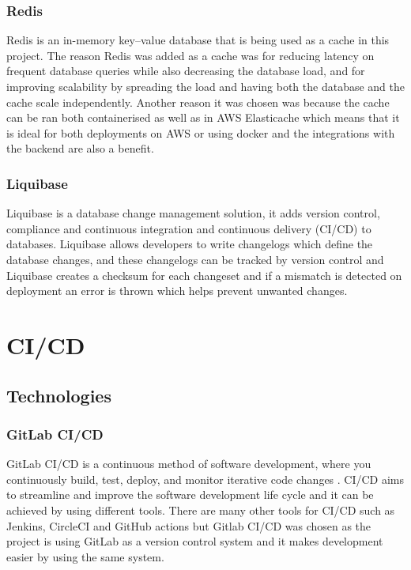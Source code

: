 \documentclass[]{project_report}
\begin{document}
\subsubsection{Redis}

Redis is an in-memory key–value database that is being used as a cache in this project. The reason Redis was added as a cache was for reducing latency on frequent database queries while also decreasing the database load, and for improving scalability by spreading the load and having both the database and the cache scale independently. Another reason it was chosen was because the cache can be ran both containerised as well as in AWS Elasticache which means that it is ideal for both deployments on AWS or using docker and the integrations with the backend are also a benefit.

\subsubsection{Liquibase}

Liquibase is a database change management solution, it adds version control, compliance and continuous integration and continuous delivery (CI/CD) to databases. Liquibase allows developers to write changelogs which define the database changes, and these changelogs can be tracked by version control and Liquibase creates a checksum for each changeset and if a mismatch is detected on deployment an error is thrown which helps prevent unwanted changes.


\section{CI/CD}
\subsection{Technologies}
\subsubsection{GitLab CI/CD}

GitLab CI/CD is a continuous method of software development, where you continuously build, test, deploy, and monitor iterative code changes \cite{gitlab}. CI/CD aims to streamline and improve the software development life cycle and it can be achieved by using different tools. There are many other tools for CI/CD such as Jenkins, CircleCI and GitHub actions but Gitlab CI/CD was chosen as the project is using GitLab as a version control system and it makes development easier by using the same system.
\end{document}
